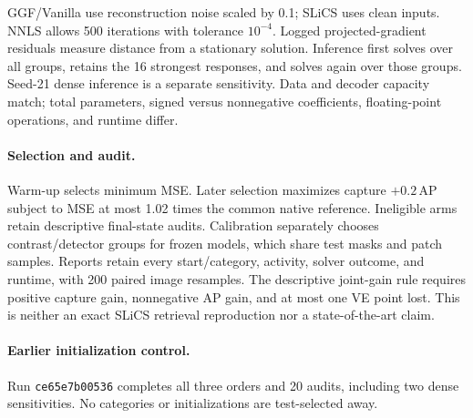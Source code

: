 GGF/Vanilla use reconstruction noise scaled by 0.1; SLiCS uses clean inputs.
NNLS allows 500 iterations with tolerance $10^{-4}$. Logged projected-gradient
residuals measure distance from a stationary solution. Inference first solves
over all groups, retains the 16 strongest responses, and solves again over
those groups. Seed-21 dense inference is a separate sensitivity. Data and
decoder capacity match; total parameters, signed versus nonnegative coefficients,
floating-point operations, and runtime differ.

\paragraph{Selection and audit.}
Warm-up selects minimum MSE. Later selection maximizes capture
$+0.2\,\mathrm{AP}$ subject to MSE at most 1.02 times the common native
reference. Ineligible arms retain descriptive final-state audits. Calibration
separately chooses contrast/detector groups for frozen models, which share
test masks and patch samples. Reports retain every start/category, activity,
solver outcome, and runtime, with 200 paired image resamples. The descriptive
joint-gain rule requires positive capture gain, nonnegative AP gain, and at
most one VE point lost. This is neither an exact SLiCS retrieval reproduction nor a state-of-the-art claim.

\paragraph{Earlier initialization control.}
Run \texttt{ce65e7b00536} completes all three orders and 20 audits, including two dense sensitivities. No categories or initializations are test-selected away.

